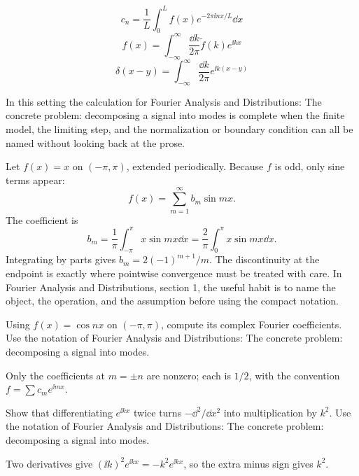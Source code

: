 \[
  c_n=\frac1L\int_0^L f(x)e^{-2\pi\ii nx/L}\dd x
\]
\[
  f(x)=\int_{-\infty}^{\infty}\frac{\dd k}{2\pi}\tilde f(k)e^{\ii kx}
\]
\[
  \delta(x-y)=\int_{-\infty}^{\infty}\frac{\dd k}{2\pi}e^{\ii k(x-y)}
\]

In this setting the calculation for Fourier Analysis and Distributions: The concrete problem: decomposing a signal into modes is complete when the finite model, the limiting step, and the normalization or boundary condition can all be named without looking back at the prose.




\begin{example}
Let \(f(x)=x\) on \((-\pi,\pi)\), extended periodically.  Because \(f\) is odd, only sine terms appear:
\[
  f(x)=\sum_{m=1}^\infty b_m\sin mx.
\]
The coefficient is
\[
  b_m=\frac1\pi\int_{-\pi}^\pi x\sin mx\dd x
  =\frac2\pi\int_0^\pi x\sin mx\dd x.
\]
Integrating by parts gives \(b_m=2(-1)^{m+1}/m\).  The discontinuity at the endpoint is exactly where pointwise convergence must be treated with care.  In Fourier Analysis and Distributions, section 1, the useful habit is to name the object, the operation, and the assumption before using the compact notation.
\end{example}



\begin{exercise}
Using \(f(x)=\cos nx\) on \((-\pi,\pi)\), compute its complex Fourier coefficients.  Use the notation of Fourier Analysis and Distributions: The concrete problem: decomposing a signal into modes.
\begin{answer}
Only the coefficients at \(m=\pm n\) are nonzero; each is \(1/2\), with the convention \(f=\sum c_me^{\ii mx}\).
\end{answer}
\end{exercise}

\begin{exercise}
Show that differentiating \(e^{\ii kx}\) twice turns \(-\dd^2/\dd x^2\) into multiplication by \(k^2\).  Use the notation of Fourier Analysis and Distributions: The concrete problem: decomposing a signal into modes.
\begin{answer}
Two derivatives give \((\ii k)^2e^{\ii kx}=-k^2e^{\ii kx}\), so the extra minus sign gives \(k^2\).
\end{answer}
\end{exercise}



